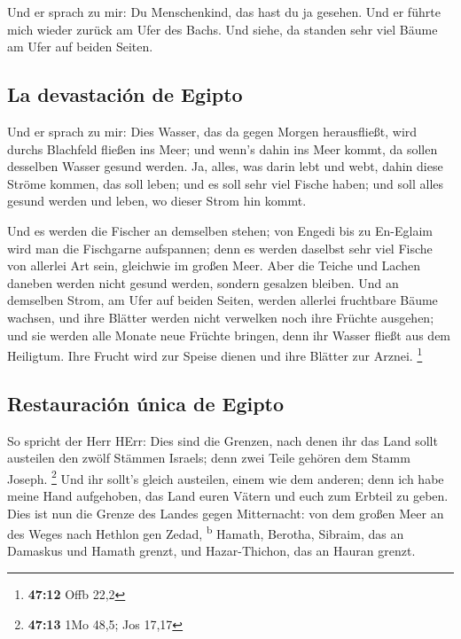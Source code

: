  Und er sprach zu mir: Du Menschenkind, das hast du ja
gesehen. Und er führte mich wieder zurück am Ufer des Bachs.
 Und siehe, da standen sehr viel Bäume am Ufer auf beiden
Seiten.

\hypertarget{la-devastaciuxf3n-de-egipto}{%
\subsection{La devastación de
Egipto}\label{la-devastaciuxf3n-de-egipto}}

 Und er sprach zu mir: Dies Wasser, das da gegen Morgen
herausfließt, wird durchs Blachfeld fließen ins Meer; und wenn's dahin
ins Meer kommt, da sollen desselben Wasser gesund werden. 
Ja, alles, was darin lebt und webt, dahin diese Ströme kommen, das soll
leben; und es soll sehr viel Fische haben; und soll alles gesund werden
und leben, wo dieser Strom hin kommt.

 Und es werden die Fischer an demselben stehen; von
Engedi bis zu En-Eglaim wird man die Fischgarne aufspannen; denn es
werden daselbst sehr viel Fische von allerlei Art sein, gleichwie im
großen Meer.  Aber die Teiche und Lachen daneben werden
nicht gesund werden, sondern gesalzen bleiben.  Und an
demselben Strom, am Ufer auf beiden Seiten, werden allerlei fruchtbare
Bäume wachsen, und ihre Blätter werden nicht verwelken noch ihre Früchte
ausgehen; und sie werden alle Monate neue Früchte bringen, denn ihr
Wasser fließt aus dem Heiligtum. Ihre Frucht wird zur Speise dienen und
ihre Blätter zur Arznei. \footnote{\textbf{47:12} Offb 22,2}

\hypertarget{restauraciuxf3n-uxfanica-de-egipto}{%
\subsection{Restauración única de
Egipto}\label{restauraciuxf3n-uxfanica-de-egipto}}

 So spricht der Herr HErr: Dies sind die Grenzen, nach
denen ihr das Land sollt austeilen den zwölf Stämmen Israels; denn zwei
Teile gehören dem Stamm Joseph. \footnote{\textbf{47:13} 1Mo 48,5; Jos
  17,17}  Und ihr sollt's gleich austeilen, einem wie dem
anderen; denn ich habe meine Hand aufgehoben, das Land euren Vätern und
euch zum Erbteil zu geben.  Dies ist nun die Grenze des
Landes gegen Mitternacht: von dem großen Meer an des Weges nach Hethlon
gen Zedad, \textsuperscript{b}  Hamath, Berotha, Sibraim,
das an Damaskus und Hamath grenzt, und Hazar-Thichon, das an Hauran
grenzt.

